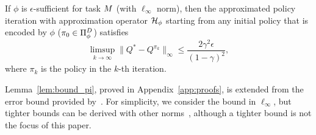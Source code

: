 \begin{lemma}
\label{lem:bound_pi}
If $\phi$ is $\epsilon$-sufficient for task $M$ (with $\ell_\infty$ norm), then the approximated policy iteration with approximation operator $\mathcal{H}_{\phi}$ starting from any initial policy that is encoded by $\phi$ ($\pi_0\in\Pi_{\phi}^D$) satisfies
\setlength\abovedisplayskip{-2pt}
\setlength\belowdisplayskip{2pt}
\begin{equation}
    \limsup_{k\to\infty} \|Q^* - Q^{\pi_k} \|_{\infty} \leq \frac{2\gamma^2\epsilon}{(1-\gamma)^2},
\end{equation}
where $\pi_k$ is the policy in the $k$-th iteration. 
\end{lemma}
Lemma~\ref{lem:bound_pi}, proved in Appendix~\ref{app:proofs}, is extended from the error bound provided by~\citet{BertsekasTsitsiklis96}. For simplicity, we consider the bound in $\ell_\infty$, but tighter bounds can be derived with other norms~\citep{munos2005error}, although a tighter bound is not the focus of this paper.

